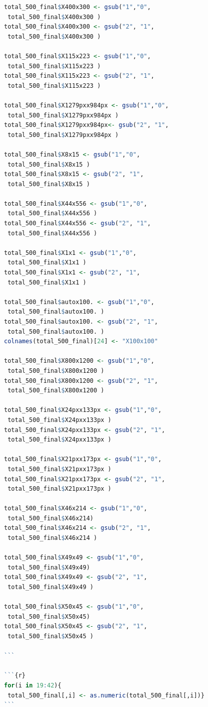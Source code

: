 \documentclass{book}
\begin{document}
\begin{lstlisting}[language=R]
total_500_final$X400x300 <- gsub("1","0",
 total_500_final$X400x300 )
total_500_final$X400x300 <- gsub("2", "1",
 total_500_final$X400x300 )

total_500_final$X115x223 <- gsub("1","0",
 total_500_final$X115x223 )
total_500_final$X115x223 <- gsub("2", "1",
 total_500_final$X115x223 )

total_500_final$X1279pxx984px <- gsub("1","0",
 total_500_final$X1279pxx984px )
total_500_final$X1279pxx984px<- gsub("2", "1",
 total_500_final$X1279pxx984px )

total_500_final$X8x15 <- gsub("1","0",
 total_500_final$X8x15 )
total_500_final$X8x15 <- gsub("2", "1",
 total_500_final$X8x15 )

total_500_final$X44x556 <- gsub("1","0",
 total_500_final$X44x556 )
total_500_final$X44x556 <- gsub("2", "1",
 total_500_final$X44x556 )

total_500_final$X1x1 <- gsub("1","0",
 total_500_final$X1x1 )
total_500_final$X1x1 <- gsub("2", "1",
 total_500_final$X1x1 )

total_500_final$autox100. <- gsub("1","0",
 total_500_final$autox100. )
total_500_final$autox100. <- gsub("2", "1",
 total_500_final$autox100. )
colnames(total_500_final)[24] <- "X100x100"

total_500_final$X800x1200 <- gsub("1","0",
 total_500_final$X800x1200 )
total_500_final$X800x1200 <- gsub("2", "1",
 total_500_final$X800x1200 )

total_500_final$X24pxx133px <- gsub("1","0",
 total_500_final$X24pxx133px )
total_500_final$X24pxx133px <- gsub("2", "1",
 total_500_final$X24pxx133px )

total_500_final$X21pxx173px <- gsub("1","0",
 total_500_final$X21pxx173px )
total_500_final$X21pxx173px <- gsub("2", "1",
 total_500_final$X21pxx173px )

total_500_final$X46x214 <- gsub("1","0",
 total_500_final$X46x214)
total_500_final$X46x214 <- gsub("2", "1",
 total_500_final$X46x214 )

total_500_final$X49x49 <- gsub("1","0",
 total_500_final$X49x49)
total_500_final$X49x49 <- gsub("2", "1",
 total_500_final$X49x49 )

total_500_final$X50x45 <- gsub("1","0",
 total_500_final$X50x45)
total_500_final$X50x45 <- gsub("2", "1",
 total_500_final$X50x45 )

```

```{r}
for(i in 19:42){
 total_500_final[,i] <- as.numeric(total_500_final[,i])}  
```
\end{lstlisting} 
\end{document}
